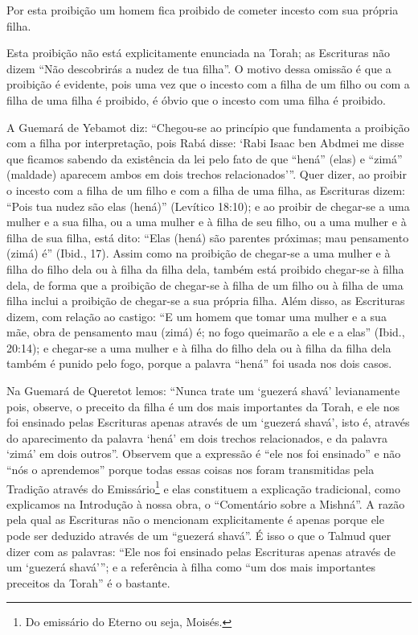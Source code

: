 Por esta proibição um homem fica proibido de cometer incesto com sua
própria filha.

Esta proibição não está explicitamente enunciada na Torah; as
Escrituras não dizem ``Não descobrirás a nudez de tua filha''. O motivo
dessa omissão é que a proibição é evidente, pois uma vez que o incesto
com a filha de um filho ou com a filha de uma filha é proibido, é óbvio
que o incesto com uma filha é proibido.

A Guemará de Yebamot diz: ``Chegou-se ao princípio que fundamenta a
proibição com a filha por interpretação, pois Rabá disse: `Rabi Isaac
ben Abdmei me disse que ficamos sabendo da existência da lei pelo fato
de que ``hená'' (elas) e ``zimá'' (maldade) aparecem ambos em dois
trechos relacionados'''. Quer dizer, ao proibir o incesto com a filha de
um filho e com a filha de uma filha, as Escrituras dizem: ``Pois tua
nudez são elas (hená)'' (Levítico 18:10); e ao proibir de chegar-se a
uma mulher e a sua filha, ou a uma mulher e à filha de seu filho, ou a
uma mulher e à filha de sua filha, está dito: ``Elas (hená) são parentes
próximas; mau pensamento (zimá) é'' (Ibid., 17). Assim como na proibição
de chegar-se a uma mulher e à filha do filho dela ou à filha da filha
dela, também está proibido chegar-se à filha dela, de forma que a
proibição de chegar-se à filha de um filho ou à filha de uma filha
inclui a proibição de chegar-se a sua própria filha. Além disso, as
Escrituras dizem, com relação ao castigo: ``E um homem que tomar uma
mulher e a sua mãe, obra de pensamento mau (zimá) é; no fogo queimarão a
ele e a elas'' (Ibid., 20:14); e chegar-se a uma mulher e à filha do
filho dela ou à filha da filha dela também é punido pelo fogo, porque a
palavra ``hená'' foi usada nos dois casos.

Na Guemará de Queretot lemos: ``Nunca trate um `guezerá shavá'
levianamente pois, observe, o preceito da filha é um dos mais
importantes da Torah, e ele nos foi ensinado pelas Escrituras apenas
através de um `guezerá shavá', isto é, através do aparecimento da
palavra `hená' em dois trechos relacionados, e da palavra `zimá' em dois
outros''. Observem que a expressão é ``ele nos foi ensinado'' e não
``nós o aprendemos'' porque todas essas coisas nos foram transmitidas
pela Tradição através do Emissário\footnote{Do emissário do Eterno ou seja, Moisés.} e elas constituem a explicação tradicional, como explicamos na Introdução à
nossa obra, o ``Comentário sobre a Mishná''. A razão pela qual as
Escrituras não o mencionam explicitamente é apenas porque ele pode ser
deduzido através de um ``guezerá shavá''. É isso o que o Talmud quer
dizer com as palavras: ``Ele nos foi ensinado pelas Escrituras apenas
através de um `guezerá shavá'''; e a referência à filha como ``um dos
mais importantes preceitos da Torah'' é o bastante.

